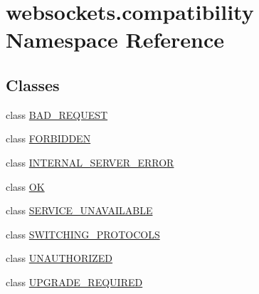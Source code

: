 \hypertarget{namespacewebsockets_1_1compatibility}{}\section{websockets.\+compatibility Namespace Reference}
\label{namespacewebsockets_1_1compatibility}
\subsection*{Classes}
\begin{DoxyCompactItemize}
\item 
class \hyperlink{classwebsockets_1_1compatibility_1_1_b_a_d___r_e_q_u_e_s_t}{B\+A\+D\+\_\+\+R\+E\+Q\+U\+E\+ST}
\item 
class \hyperlink{classwebsockets_1_1compatibility_1_1_f_o_r_b_i_d_d_e_n}{F\+O\+R\+B\+I\+D\+D\+EN}
\item 
class \hyperlink{classwebsockets_1_1compatibility_1_1_i_n_t_e_r_n_a_l___s_e_r_v_e_r___e_r_r_o_r}{I\+N\+T\+E\+R\+N\+A\+L\+\_\+\+S\+E\+R\+V\+E\+R\+\_\+\+E\+R\+R\+OR}
\item 
class \hyperlink{classwebsockets_1_1compatibility_1_1_o_k}{OK}
\item 
class \hyperlink{classwebsockets_1_1compatibility_1_1_s_e_r_v_i_c_e___u_n_a_v_a_i_l_a_b_l_e}{S\+E\+R\+V\+I\+C\+E\+\_\+\+U\+N\+A\+V\+A\+I\+L\+A\+B\+LE}
\item 
class \hyperlink{classwebsockets_1_1compatibility_1_1_s_w_i_t_c_h_i_n_g___p_r_o_t_o_c_o_l_s}{S\+W\+I\+T\+C\+H\+I\+N\+G\+\_\+\+P\+R\+O\+T\+O\+C\+O\+LS}
\item 
class \hyperlink{classwebsockets_1_1compatibility_1_1_u_n_a_u_t_h_o_r_i_z_e_d}{U\+N\+A\+U\+T\+H\+O\+R\+I\+Z\+ED}
\item 
class \hyperlink{classwebsockets_1_1compatibility_1_1_u_p_g_r_a_d_e___r_e_q_u_i_r_e_d}{U\+P\+G\+R\+A\+D\+E\+\_\+\+R\+E\+Q\+U\+I\+R\+ED}
\end{DoxyCompactItemize}
